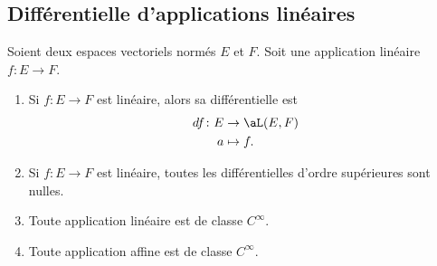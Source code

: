 \subsection{Différentielle d'applications linéaires}

\begin{lemma}       \label{LEMooZSNMooCfjzOB}
	Soient deux espaces vectoriels normés \( E\) et \( F\). Soit une application linéaire \( f\colon E\to F\).
	\begin{enumerate}
		\item
		      Si \( f\colon E\to F\) est linéaire, alors sa différentielle est
		      \begin{equation}
			      \begin{aligned}
				      df\colon E & \to  \aL(E,F) \\
				      a          & \mapsto f.
			      \end{aligned}
		      \end{equation}
		\item
		      Si \( f\colon E\to F\) est linéaire, toutes les différentielles d'ordre supérieures sont nulles.
		\item
		      Toute application linéaire est de classe \(  C^{\infty}\).
		\item
		      Toute application affine est de classe \(  C^{\infty}\).
	\end{enumerate}
\end{lemma}

